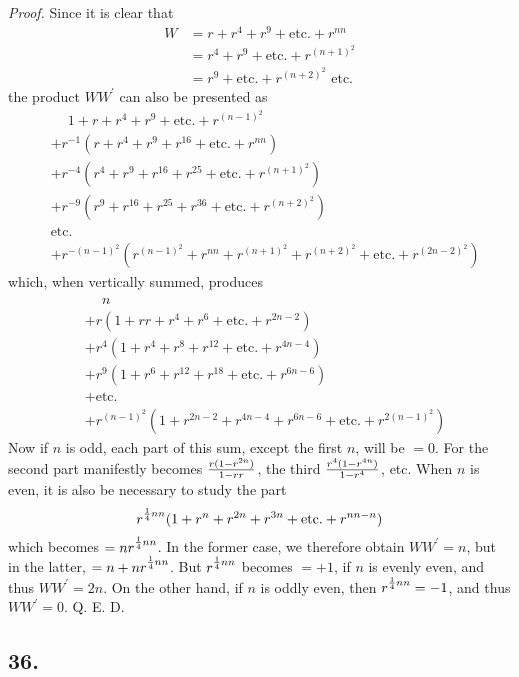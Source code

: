 \documentclass[twoside,12pt]{memoir}
\let\oldfrac\frac
\def\frac#1#2{\mathchoice{\tfrac{#1}{#2}}{\oldfrac{#1}{#2}}{\genfrac{}{}{}{2}{#1}{#2\mathstrut}}{\genfrac{}{}{}{3}{#1}{#2\mathstrut}}}
\begin{document}
\textit{Proof.} Since it is clear that
\[\begin{aligned}
W & =r+r^{4}+r^{9}+\text{etc{.}}+r^{n n} \\
& =r^{4}+r^{9}+\text{etc{.}}+r^{(n+1)^{2}} \\
& =r^{9}+\text{etc{.}}+r^{(n+2)^{2}} \text{ etc{.}}
\end{aligned}\]
the product \(W {W}^{\prime}\) can also be presented as
\[\begin{aligned}
&\phantom{ +, } 1+r+r^{4}+r^{9}+\text{etc{.}}+r^{(n-1)^{2}} \\
&+ r^{-1}(r+r^{4}+r^{9}+r^{16}+\text{etc{.}}+r^{n n}) \\
&+ r^{-4}(r^{4}+r^{9}+r^{16}+r^{25}+\text{etc{.}}+r^{(n+1)^{2}}) \\
&+ r^{-9}(r^{9}+r^{16}+r^{25}+r^{36}+\text{etc{.}}+r^{(n+2)^{2}}) \\
&\text{etc{.}} \\
&+ r^{-(n-1)^{2}}(r^{(n-1)^{2}}+r^{n n}+r^{(n+1)^{2}}+r^{(n+2)^{2}}+\text{etc{.}}+r^{(2 n-2)^{2}})
\end{aligned}\]
which, when vertically summed, produces
\[\begin{aligned}
&\phantom{+}n \\
&+r(1+r r+r^{4}+r^{6}+\text{etc{.}}+r^{2 n-2}) \\
&+r^{4}(1+r^{4}+r^{8}+r^{12}+\text{etc{.}}+r^{4 n-4}) \\
&+r^{9}(1+r^{6}+r^{12}+r^{18}+\text{etc{.}}+r^{6 n-6}) \\
&+\text{etc{.}} \\
&+r^{(n-1)^{2}}(1+r^{2 n-2}+r^{4 n-4}+r^{6 n-6}+\text{etc{.}}+r^{2(n-1)^{2}})
\end{aligned}\]
Now if \(n\) is odd, each part of this sum, except the first \(n\), will be \(=0\).  For the second part manifestly becomes \(\frac{r(1-r^{2 n})}{1-r r}\), the third \(\frac{r^{4}(1-r^{4 n})}{1-r^{4}}\), etc{.}  When \(n\) is even, it is also be necessary to study the part
\[r^{\frac{1}{4} n n}(1+r^{n}+r^{2 n}+r^{3 n}+\text{etc{.}}+r^{n n-n})\]
which becomes \(=n r^{\frac{1}{4} n n}\). In the former case, we therefore obtain \(W W^{\prime}=n\), but in the latter, \(=n+n r^{\frac{1}{4} n n}\).  But \(r^{\frac{1}{4} n n}\) becomes \(=+1\), if \(n\) is evenly even, and thus \(W W^{\prime}=2 n\). On the other hand, if \(n\) is oddly even, then \(r^{\frac{1}{4} n n}=-1\), and thus \(W W^{\prime}=0\). Q. E. D.
%

\subsection*{36.}
\end{document}
